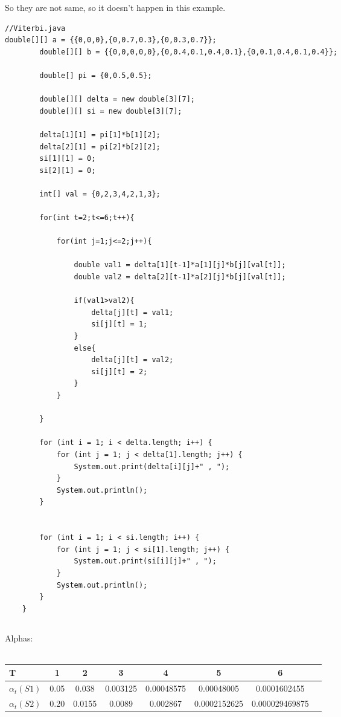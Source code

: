 \documentclass[paper=a4, fontsize=11pt]{scrartcl} %
\numberwithin{equation}{section} %
\numberwithin{figure}{section} %
\numberwithin{table}{section} %
\begin{document}
So they are not same, so it doesn't happen in this example.\\

\begin{lstlisting}
//Viterbi.java
double[][] a = {{0,0,0},{0,0.7,0.3},{0,0.3,0.7}};
		double[][] b = {{0,0,0,0,0},{0,0.4,0.1,0.4,0.1},{0,0.1,0.4,0.1,0.4}};
		
		double[] pi = {0,0.5,0.5};
		
		double[][] delta = new double[3][7];
		double[][] si = new double[3][7];
		
		delta[1][1] = pi[1]*b[1][2];
		delta[2][1] = pi[2]*b[2][2];
		si[1][1] = 0;
		si[2][1] = 0;
		
		int[] val = {0,2,3,4,2,1,3};
		
		for(int t=2;t<=6;t++){
			
			for(int j=1;j<=2;j++){
				
				double val1 = delta[1][t-1]*a[1][j]*b[j][val[t]];
				double val2 = delta[2][t-1]*a[2][j]*b[j][val[t]];
				
				if(val1>val2){
					delta[j][t] = val1;
					si[j][t] = 1;
				}
				else{
					delta[j][t] = val2;
					si[j][t] = 2;
				}
			}
			
		}
		
		for (int i = 1; i < delta.length; i++) {
			for (int j = 1; j < delta[1].length; j++) {
				System.out.print(delta[i][j]+" , ");
			}
			System.out.println();
		}
		
		
		for (int i = 1; i < si.length; i++) {
			for (int j = 1; j < si[1].length; j++) {
				System.out.print(si[i][j]+" , ");
			}
			System.out.println();
		}
	}
\end{lstlisting}


\subsection{}

Alphas:\\\\
\begin{tabular}{l*{7}{c}}
\textbf{T} & \textbf{1} &  \textbf{2} & \textbf{3} & \textbf{4} & \textbf{5} & \textbf{6} \\
\hline
\textbf{$\alpha_{t}(S1)$} & 0.05 & 0.038 & 0.003125 & 0.00048575 & 0.00048005 & 0.0001602455 \\
\textbf{$\alpha_{t}(S2)$} & 0.20 & 0.0155 & 0.0089 & 0.002867 & 0.0002152625 & 0.000029469875
\end{tabular}\\\\
\end{document}
